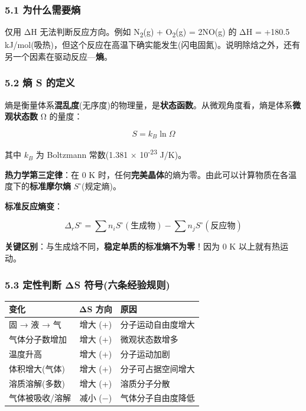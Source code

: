 \documentclass[a4paper,11pt]{ctexart}
\newcounter{none}
\begin{document}
\subsubsection{5.1 为什么需要熵}\label{ux4e3aux4ec0ux4e48ux9700ux8981ux71b5}

仅用 ΔH 无法判断反应方向。例如 N\textsubscript{2}(g) + O\textsubscript{2}(g) = 2NO(g) 的 ΔH = +180.5 kJ/mol(吸热)，但这个反应在高温下确实能发生(闪电固氮)。说明除焓之外，还有另一个因素在驱动反应---\textbf{熵}。

\subsubsection{5.2 熵 S 的定义}\label{ux71b5-s-ux7684ux5b9aux4e49}

熵是衡量体系\textbf{混乱度}(无序度)的物理量，是\textbf{状态函数}。从微观角度看，熵是体系\textbf{微观状态数} Ω 的量度：

\[
S = k_B \ln \Omega
\]

其中 \(k_B\) 为 Boltzmann 常数(1.381 × 10\textsuperscript{-23} J/K)。

\textbf{热力学第三定律}：在 0 K 时，任何\textbf{完美晶体}的熵为零。由此可以计算物质在各温度下的\textbf{标准摩尔熵} \(S^\circ\)(规定熵)。

\textbf{标准反应熵变}：

\[
\Delta_r S^\circ = \sum n_i S^\circ(\text{生成物}) - \sum n_j S^\circ(\text{反应物})
\]

\textbf{关键区别}：与生成焓不同，\textbf{稳定单质的标准熵不为零}！因为 0 K 以上就有热运动。

\subsubsection{5.3 定性判断 ΔS 符号(六条经验规则)}\label{ux5b9aux6027ux5224ux65ad-ux3b4s-ux7b26ux53f7ux516dux6761ux7ecfux9a8cux89c4ux5219}

{\def\LTcaptype{none} %
\begin{longtable}[]{@{}lcl@{}}
\toprule\noalign{}
变化 & ΔS 方向 & 原因 \\
\midrule\noalign{}
\endhead
\bottomrule\noalign{}
\endlastfoot
固 → 液 → 气 & 增大 (+) & 分子运动自由度增大 \\
气体分子数增加 & 增大 (+) & 微观状态数增多 \\
温度升高 & 增大 (+) & 分子运动加剧 \\
体积增大(气体) & 增大 (+) & 分子可占据空间增大 \\
溶质溶解(多数) & 增大 (+) & 溶质分子分散 \\
气体被吸收/溶解 & 减小 (−) & 气体分子自由度降低 \\
\end{longtable}
}
\end{document}
